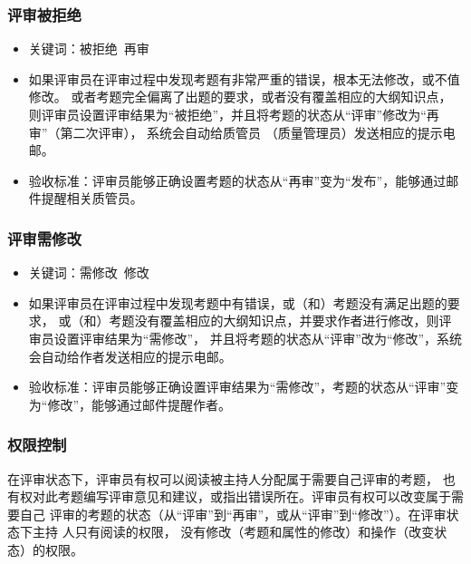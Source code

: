 \documentclass[hyperref, a4paper]{ctexart}
\providecommand{\tightlist}{%
  \setlength{\itemsep}{0pt}\setlength{\parskip}{0pt}}
\begin{document}
\hypertarget{ux8bc4ux5ba1ux88abux62d2ux7edd}{%
\subsubsection{评审被拒绝}\label{ux8bc4ux5ba1ux88abux62d2ux7edd}}

\begin{itemize}
\tightlist
\item
  关键词：被拒绝~再审
\item
  如果评审员在评审过程中发现考题有非常严重的错误，根本无法修改，或不值修改。
  或者考题完全偏离了出题的要求，或者没有覆盖相应的大纲知识点，
  则评审员设置评审结果为``被拒绝''，并且将考题的状态从``评审''修改为``再审''（第二次评审），
  系统会自动给质管员 （质量管理员）发送相应的提示电邮。
\item
  验收标准：评审员能够正确设置考题的状态从``再审''变为``发布''，能够通过邮件提醒相关质管员。
\end{itemize}

\hypertarget{ux8bc4ux5ba1ux9700ux4feeux6539}{%
\subsubsection{评审需修改}\label{ux8bc4ux5ba1ux9700ux4feeux6539}}

\begin{itemize}
\tightlist
\item
  关键词：需修改~修改
\item
  如果评审员在评审过程中发现考题中有错误，或（和）考题没有满足出题的要求，
  或（和）考题没有覆盖相应的大纲知识点，并要求作者进行修改，则评审员设置评审结果为``需修改''，
  并且将考题的状态从``评审''改为``修改''，系统会自动给作者发送相应的提示电邮。
\item
  验收标准：评审员能够正确设置评审结果为``需修改''，考题的状态从``评审''变为``修改''，能够通过邮件提醒作者。
\end{itemize}

\hypertarget{ux6743ux9650ux63a7ux5236}{%
\subsubsection{权限控制}\label{ux6743ux9650ux63a7ux5236}}

在评审状态下，评审员有权可以阅读被主持人分配属于需要自己评审的考题，
也有权对此考题编写评审意见和建议，或指出错误所在。评审员有权可以改变属于需要自己
评审的考题的状态（从``评审''到``再审''，或从``评审''到``修改''）。在评审状态下主持
人只有阅读的权限，
没有修改（考题和属性的修改）和操作（改变状态）的权限。
\end{document}
